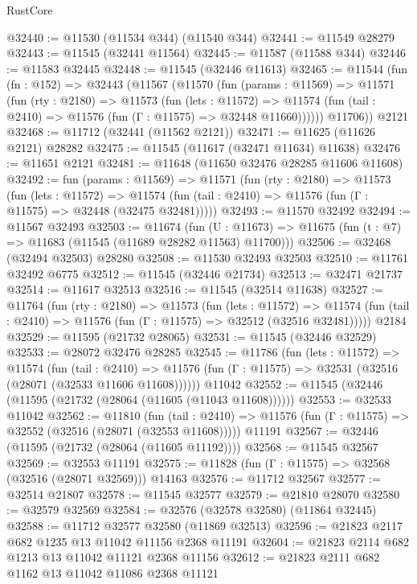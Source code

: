\begin{lexlean}{RustCore}
\begin{coremodule}
@32440 := @11530 (@11534 @344) (@11540 @344)
@32441 := @11549 @28279
@32443 := @11545 (@32441 @11564)
@32445 := @11587 (@11588 @344)
@32446 := @11583 @32445
@32448 := @11545 (@32446 @11613)
@32465 := @11544
    (fun (fn : @152) =>
    @32443
      (@11567
        (@11570
          (fun (params : @11569) =>
          @11571
            (fun (rty : @2180) =>
            @11573
              (fun (lets : @11572) =>
              @11574 (fun (tail : @2410) => @11576 (fun (Γ : @11575) => @32448 @11660))))))
        @11706))
    @2121
@32468 := @11712 (@32441 (@11562 @2121))
@32471 := @11625 (@11626 @2121) @28282
@32475 := @11545 (@11617 (@32471 @11634) @11638)
@32476 := @11651 @2121
@32481 := @11648 (@11650 @32476 @28285 @11606 @11608)
@32492 := fun (params : @11569) =>
  @11571
    (fun (rty : @2180) =>
    @11573
      (fun (lets : @11572) =>
      @11574 (fun (tail : @2410) => @11576 (fun (Γ : @11575) => @32448 (@32475 @32481)))))
@32493 := @11570 @32492
@32494 := @11567 @32493
@32503 := @11674
    (fun (U : @11673) => @11675 (fun (t : @7) => @11683 (@11545 (@11689 @28282 @11563) @11700)))
@32506 := @32468 (@32494 @32503) @28280
@32508 := @11530 @32493 @32503
@32510 := @11761 @32492 @6775
@32512 := @11545 (@32446 @21734)
@32513 := @32471 @21737
@32514 := @11617 @32513
@32516 := @11545 (@32514 @11638)
@32527 := @11764
    (fun (rty : @2180) =>
    @11573
      (fun (lets : @11572) =>
      @11574 (fun (tail : @2410) => @11576 (fun (Γ : @11575) => @32512 (@32516 @32481)))))
    @2184
@32529 := @11595 (@21732 @28065)
@32531 := @11545 (@32446 @32529)
@32533 := @28072 @32476 @28285
@32545 := @11786
    (fun (lets : @11572) =>
    @11574
      (fun (tail : @2410) =>
      @11576 (fun (Γ : @11575) => @32531 (@32516 (@28071 (@32533 @11606 @11608))))))
    @11042
@32552 := @11545 (@32446 (@11595 (@21732 (@28064 (@11605 (@11043 @11608))))))
@32553 := @32533 @11042
@32562 := @11810
    (fun (tail : @2410) => @11576 (fun (Γ : @11575) => @32552 (@32516 (@28071 (@32553 @11608)))))
    @11191
@32567 := @32446 (@11595 (@21732 (@28064 (@11605 @11192))))
@32568 := @11545 @32567
@32569 := @32553 @11191
@32575 := @11828 (fun (Γ : @11575) => @32568 (@32516 (@28071 @32569))) @14163
@32576 := @11712 @32567
@32577 := @32514 @21807
@32578 := @11545 @32577
@32579 := @21810 @28070
@32580 := @32579 @32569
@32584 := @32576 (@32578 @32580) (@11864 @32445)
@32588 := @11712 @32577 @32580 (@11869 @32513)
@32596 := @21823 @2117 @682 @1235 @13 @11042 @11156 @2368 @11191
@32604 := @21823 @2114 @682 @1213 @13 @11042 @11121 @2368 @11156
@32612 := @21823 @2111 @682 @1162 @13 @11042 @11086 @2368 @11121

\end{coremodule}
\end{lexlean}

